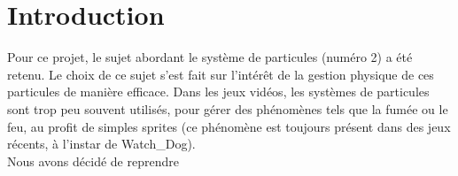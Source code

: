 \chapter*{Introduction}

Pour ce projet, le sujet abordant le système de particules (numéro 2) a été
retenu. Le choix de ce sujet s'est fait sur l'intérêt de la gestion physique de
ces particules de manière efficace. Dans les jeux vidéos, les systèmes de
particules sont trop peu souvent utilisés, pour gérer des phénomènes tels que la
fumée ou le feu, au profit de simples sprites (ce phénomène est toujours présent
dans des jeux récents, à l'instar de Watch\_Dog).\\

Nous avons décidé de reprendre
